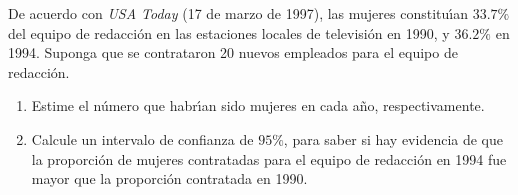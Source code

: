 \begin{enunciado}
 De acuerdo con \textit{USA Today} (17 de marzo de 1997), las mujeres constitu\'{\i}an $33.7\%$ del equipo de redacci\'on en las estaciones locales de televisi\'on en 1990, y $36.2\%$ en 1994. Suponga que se contrataron 20 nuevos empleados para el equipo de redacci\'on.
 \begin{enumerate}
  \item Estime el n\'umero que habr\'{\i}an sido mujeres en cada a\~no, respectivamente.
  \item Calcule un intervalo de confianza de $95\%$, para saber si hay evidencia de que la proporci\'on de mujeres contratadas para el equipo de redacci\'on en 1994 fue mayor que la proporci\'on contratada en 1990.
 \end{enumerate}
\end{enunciado}

